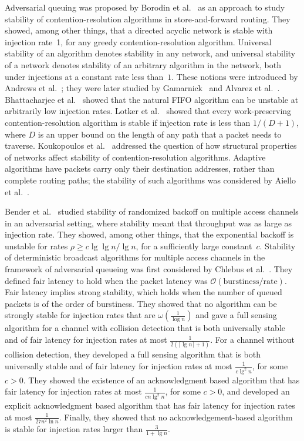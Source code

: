 \documentclass[11pt]{article}
\newcommand{\cO}{\mathcal{O}}
\begin{document}
Adversarial queuing  was proposed by Borodin et al.~\cite{BorodinKRSW-JACM01} as an approach to study stability of contention-resolution algorithms in store-and-forward routing.
They showed, among other things, that a directed acyclic network is stable with injection rate~1, for any greedy contention-resolution algorithm.
Universal stability of an algorithm denotes stability in any network, and universal stability of a network denotes stability of an arbitrary algorithm in the network, both under injections at a constant rate less than~$1$.
These notions were introduced by Andrews et al.~\cite{AndrewsAFLLK-JACM01}; they were later studied by Gamarnick~\cite{Gamarnik-SICOMP03} and Alvarez et al.~\cite{AlvarezBS-SICOMP04}.
Bhattacharjee et al.~\cite{BhattacharjeeGL-SICOMP04} showed that the natural FIFO algorithm can be unstable at arbitrarily low injection rates.
Lotker et al.~\cite{LotkerPR04} showed that every work-preserving contention-resolution algorithm is stable if injection rate is less than $1/(D+1)$, where $D$ is an upper bound on the length of any path that a packet needs to traverse.
Koukopoulos et al.~\cite{KoukopoulosMNS-TCSy05}  addressed the question of how structural properties of networks affect stability of contention-resolution algorithms.
Adaptive algorithms have packets carry only their destination addresses, rather than complete routing paths; the stability of such algorithms was considered by Aiello et al.~\cite{AielloKOR-JCSS00}.

Bender et al.~\cite{BenderFHKL-SPAA05} studied stability of randomized backoff on multiple access channels in an adversarial setting, where stability meant that throughput was as large as injection rate.
They showed, among other things, that the exponential backoff is unstable for rates $\rho\ge c \lg\lg n/\lg n$, for a sufficiently large constant~$c$.
Stability of deterministic broadcast algorithms for multiple access channels in the framework of adversarial queueing was first considered by Chlebus et al.~\cite{ChlebusKR-TALG12}.
They defined fair latency to hold when the packet latency was $\cO(\textrm{burstiness}/\text{rate})$.
Fair latency implies strong stability, which holds when the number of queued packets is of the order of burstiness.
They showed that no algorithm can be strongly stable for injection rates that are $\omega(\frac{1}{\log n})$ and gave a full sensing algorithm for a channel with collision detection that is  both universally stable and of fair latency for injection rates at most $\frac{1}{2(\lceil\lg n\rceil+1)}$.
For a channel without collision detection, they developed a full sensing algorithm that is both universally stable and of fair latency for injection rates at most $\frac{1}{c \lg^2 n}$,  for some $c>0$.
They showed the existence of an acknowledgment based algorithm that has fair latency for injection rates at most $\frac{1}{c n\lg^2 n}$, for some $c>0$, and developed an explicit acknowledgment based algorithm that has fair latency for injection rates at most $\frac{1}{27 n^2\ln n}$.
Finally, they showed that no acknowledgement-based algorithm is stable for injection rates larger than $\frac{3}{1+\lg n}$.
\end{document}
